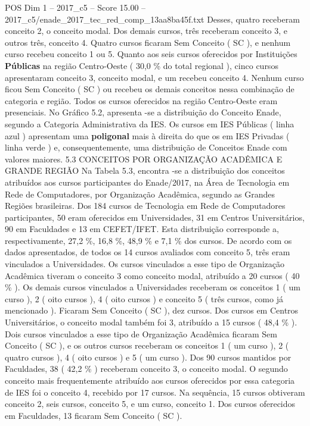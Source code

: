 \begin{textsample}{POS Dim 1 – 2017\_c5 – Score 15.00 – 2017\_c5/enade\_2017\_tec\_red\_comp\_13aa8ba45f.txt}
Desses, quatro receberam conceito 2, o conceito modal.
Dos demais cursos, três receberam conceito 3, e outros três, conceito 4.
Quatro cursos ficaram Sem Conceito ( SC ), e nenhum curso recebeu conceito 1 ou 5.
Quanto aos seis cursos oferecidos por Instituições \textbf{Públicas} na região Centro-Oeste ( 30,0 \% do total regional ), cinco cursos apresentaram conceito 3, conceito modal, e um recebeu conceito 4.
Nenhum curso ficou Sem Conceito ( SC ) ou recebeu os demais conceitos nessa combinação de categoria e região.
Todos os cursos oferecidos na região Centro-Oeste eram presenciais.
No Gráfico 5.2, apresenta -se a distribuição do Conceito Enade, segundo a Categoria Administrativa da IES.
Os cursos em IES Públicas ( linha azul ) apresentam uma \textbf{poligonal} mais à direita do que os em IES Privadas ( linha verde ) e, consequentemente, uma distribuição de Conceitos Enade com valores maiores. 5.3 CONCEITOS POR ORGANIZAÇÃO ACADÊMICA E GRANDE REGIÃO Na Tabela 5.3, encontra -se a distribuição dos conceitos atribuídos aos cursos participantes do Enade/2017, na Área de Tecnologia em Rede de Computadores, por Organização Acadêmica, segundo as Grandes Regiões brasileiras.
Dos 184 cursos de Tecnologia em Rede de Computadores participantes, 50 eram oferecidos em Universidades, 31 em Centros Universitários, 90 em Faculdades e 13 em CEFET/IFET.
Esta distribuição corresponde a, respectivamente, 27,2 \%, 16,8 \%, 48,9 \% e 7,1 \% dos cursos.
De acordo com os dados apresentados, de todos os 14 cursos avaliados com conceito 5, três eram vinculados a Universidades.
Os cursos vinculados a esse tipo de Organização Acadêmica tiveram o conceito 3 como conceito modal, atribuído a 20 cursos ( 40 \% ).
Os demais cursos vinculados a Universidades receberam os conceitos 1 ( um curso ), 2 ( oito cursos ), 4 ( oito cursos ) e conceito 5 ( três cursos, como já mencionado ).
Ficaram Sem Conceito ( SC ), dez cursos.
Dos cursos em Centros Universitários, o conceito modal também foi 3, atribuído a 15 cursos ( 48,4 \% ).
Dois cursos vinculados a esse tipo de Organização Acadêmica ficaram Sem Conceito ( SC ), e os outros cursos receberam os conceitos 1 ( um curso ), 2 ( quatro cursos ), 4 ( oito cursos ) e 5 ( um curso ).
Dos 90 cursos mantidos por Faculdades, 38 ( 42,2 \% ) receberam conceito 3, o conceito modal.
O segundo conceito mais frequentemente atribuído aos cursos oferecidos por essa categoria de IES foi o conceito 4, recebido por 17 cursos.
Na sequência, 15 cursos obtiveram conceito 2, seis cursos, conceito 5, e um curso, conceito 1.
Dos cursos oferecidos em Faculdades, 13 ficaram Sem Conceito ( SC ).

\end{textsample}
